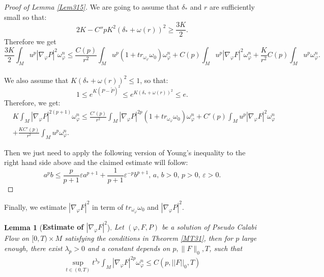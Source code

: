 \documentclass[11pt]{amsart}
\newtheorem{lem}{Lemma}[section]
\numberwithin{equation}{section}
\newcommand \eps{\varepsilon}
\begin{document}
\begin{proof}[Proof of Lemma \ref{Lem315}]
We are going to assume that $\delta_*$ and $r$ are sufficiently small so that:
\begin{equation}
2K-C''pK^2(\delta_*+\omega(r))^2\ge \frac{3K}{2}.
\end{equation}
Therefore we get
\begin{equation}\label{K8}
\frac{3K}{2} \int_M u^p|\nabla_{\varphi}P|^2 \omega_{\varphi}^n \le   \frac{C(p) }{r^2}\int_M u^p (1+tr_{\omega_{\varphi}}\omega_0)\omega_\varphi^n +C(p)\int_M u^p |\nabla_\varphi F|^2\omega_\varphi^n + \frac{K}{r^2}C(p)\int_M u^p \omega_\varphi^n.
\end{equation}\\
We also assume that $K(\delta_*+\omega(r))^2\le 1$,  so that:
\begin{equation*}
1\le e^{K(P-\tilde{P})^2}\le e^{K(\delta_*+\omega(r))^2}\le e.  
\end{equation*}
Therefore,  we get:
\begin{equation*}
\begin{split}
&K\int_M|\nabla_{\varphi}P|^{2(p+1)}\omega_{\varphi}^n\le \frac{C'(p)}{r^2}\int_M|\nabla_{\varphi}P|^{2p}(1+tr_{\omega_{\varphi}}\omega_0)\omega_{\varphi}^n+C'(p)\int_Mu^p|\nabla_{\varphi}F|^2\omega_{\varphi}^n\\
&+\frac{KC'(p)}{r^2}\int_Mu^p\omega_{\varphi}^n.
\end{split}
\end{equation*}

Then we just need to apply the following version of Young's inequality to the right hand side above and the claimed estimate will follow:
\begin{equation*}
a^pb\le \frac{p}{p+1}\eps a^{p+1}+\frac{1}{p+1}\eps^{-p}b^{p+1},\,a,\,b>0,\,p>0,\,\eps>0.
\end{equation*}
\end{proof}  











\noindent
Finally, we estimate $|\nabla_\varphi F|^2$ in term of $tr_{\omega_{\varphi}}\omega_0$ and $|\nabla_\varphi P|^2$. \\
\begin{lem}[\textbf{Estimate of $|\nabla_\varphi F|^2$}]\label{Lem316}
	 Let $(\varphi,F,P)$ be a solution of Pseudo Calabi Flow on $[0,T)\times M$ satisfying the conditions in Theorem \ref{MT31}, then for $p$ large enough, there exist $\lambda_p >0$ and a constant depends on  $ p, \|F\|_0,T$, such that  
\begin{align}
	\sup_{t\in (0,T)} t^{\lambda_p} \int_M |\nabla_\varphi F|^{2p}\omega_\varphi^n \le  C(p,||F||_0,T)
\end{align}\\
\end{lem}
\end{document}
